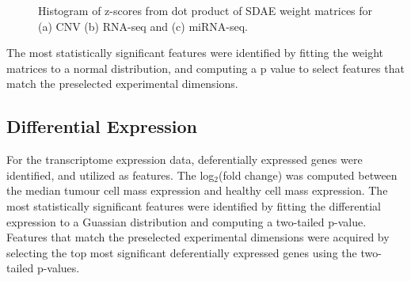 \begin{figure}[h!]
     \centering
         \centering
     \hfill
         \centering
     \hfill
         \centering

        \caption{Histogram of z-scores from dot product of SDAE weight matrices for (a) CNV (b) RNA-seq and (c) miRNA-seq.}
        \label{fig:zscoreHist}
\end{figure}

The most statistically significant features were identified by fitting the weight matrices to a normal distribution, and computing a p value to select features that match the preselected experimental dimensions.

\subsection{Differential Expression}

For the transcriptome expression data, deferentially expressed genes were identified, and utilized as features. The log$_{2}$(fold change) was computed between the median tumour cell mass expression and healthy cell mass expression. The most statistically significant features were identified by fitting the differential expression to a Guassian distribution and computing a two-tailed p-value. Features that match the preselected experimental dimensions were acquired by selecting the top most significant deferentially expressed genes using the two-tailed p-values. 

